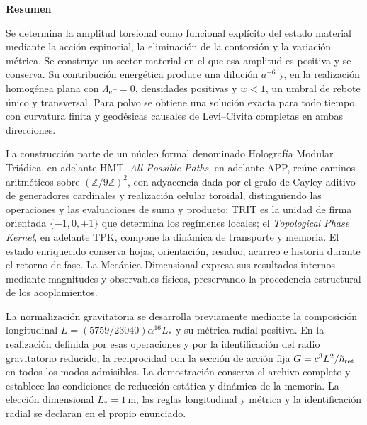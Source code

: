 
\begin{center}\bfseries Resumen\end{center}
\begingroup
\fontsize{9.5}{10.7}\selectfont
\setlength{\parskip}{1.5pt plus .5pt minus .5pt}
\noindent
Se determina la amplitud torsional como funcional explícito del estado
material mediante la acción espinorial, la eliminación de la contorsión
y la variación métrica. Se construye un sector material en el que esa
amplitud es positiva y se conserva. Su contribución energética produce
una dilución \(a^{-6}\) y, en la realización homogénea plana con
\(\Lambda_{\mathrm{eff}}=0\), densidades positivas y \(w<1\), un umbral
de rebote único y transversal. Para polvo se obtiene una solución exacta
para todo tiempo, con curvatura finita y geodésicas causales de
Levi--Civita completas en ambas direcciones.

La construcción parte de un núcleo formal denominado Holografía Modular
Triádica, en adelante HMT. \emph{All Possible Paths}, en adelante APP,
reúne caminos aritméticos sobre \((\mathbb Z/9\mathbb Z)^2\), con
adyacencia dada por el grafo de Cayley aditivo de generadores cardinales
y realización celular toroidal, distinguiendo las operaciones y las
evaluaciones de suma y producto;
TRIT es la unidad de firma orientada \(\{-1,0,+1\}\) que determina los
regímenes locales; el \emph{Topological Phase Kernel}, en adelante TPK,
compone la dinámica de transporte y memoria. El estado enriquecido
conserva hojas, orientación, residuo, acarreo e historia durante el
retorno de fase. La Mecánica Dimensional expresa sus resultados
internos mediante magnitudes y observables físicos, preservando la
procedencia estructural de los acoplamientos.

La normalización gravitatoria se desarrolla previamente mediante la
composición longitudinal \(L=(5759/23040)\alpha^{16}L_*\) y su
métrica radial positiva. En la realización definida por esas operaciones
y por la identificación del radio gravitatorio reducido, la reciprocidad
con la sección de acción fija \(G=c^3L^2/\hbar_{\rm ret}\) en todos
los modos admisibles. La demostración conserva el archivo completo y
establece las condiciones de reducción estática y dinámica de la memoria.
La elección dimensional \(L_*=1\,\mathrm m\), las reglas longitudinal
y métrica y la identificación radial se declaran en el propio enunciado.

